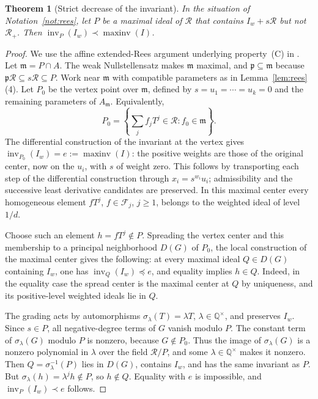 \documentclass[11pt]{amsart}
\numberwithin{equation}{section}
\newtheorem{theorem}{Theorem}[section]
\theoremstyle{definition}
\newcommand{\Q}{\mathbb{Q}}
\newcommand{\fm}{\mathfrak{m}}
\newcommand{\fp}{\mathfrak{p}}
\newcommand{\cF}{\mathcal{F}}
\newcommand{\cR}{\mathcal{R}}
\DeclareMathOperator{\inv}{inv}
\DeclareMathOperator{\maxinv}{maxinv}
\begin{document}
\begin{theorem}[Strict decrease of the invariant]\label{thm:drop}
In the situation of Notation~\ref{not:rees}, let $P$ be a maximal ideal of $\cR$ that contains $I_w+s\cR$ but not $\cR_+$. Then $\inv_P(I_w)\prec\maxinv(I)$.
\end{theorem}

\begin{proof}
We use the affine extended-Rees argument underlying property~(C) in \cite[Section~2.2]{Brais}. Let $\fm=P\cap A$. The weak Nullstellensatz makes $\fm$ maximal, and $\fp\subseteq\fm$ because $\fp\cR\subseteq s\cR\subseteq P$. Work near $\fm$ with compatible parameters as in Lemma~\ref{lem:rees}(4). Let $P_0$ be the vertex point over $\fm$, defined by $s=u_1=\cdots=u_k=0$ and the remaining parameters of $A_\fm$. Equivalently,
\[
  P_0=\left\{\sum_j f_jT^j\in\cR:f_0\in\fm\right\}.
\]
The differential construction of the invariant at the vertex gives
$\inv_{P_0}(I_w)=e:=\maxinv(I)$: the positive weights are those of the original center, now on the $u_i$, with $s$ of weight zero. This follows by transporting each step of the differential construction through $x_i=s^{w_i}u_i$; admissibility and the successive least derivative candidates are preserved. In this maximal center every homogeneous element $fT^j$, $f\in\cF_j$, $j\ge1$, belongs to the weighted ideal of level $1/d$.

Choose such an element $h=fT^j\notin P$. Spreading the vertex center and this membership to a principal neighborhood $D(G)$ of $P_0$, the local construction of the maximal center gives the following: at every maximal ideal $Q\in D(G)$ containing $I_w$, one has $\inv_Q(I_w)\preceq e$, and equality implies $h\in Q$. Indeed, in the equality case the spread center is the maximal center at $Q$ by uniqueness, and its positive-level weighted ideals lie in $Q$.

The grading acts by automorphisms $\sigma_\lambda(T)=\lambda T$, $\lambda\in\Q^\times$, and preserves $I_w$. Since $s\in P$, all negative-degree terms of $G$ vanish modulo $P$. The constant term of $\sigma_\lambda(G)$ modulo $P$ is nonzero, because $G\notin P_0$. Thus the image of $\sigma_\lambda(G)$ is a nonzero polynomial in $\lambda$ over the field $\cR/P$, and some $\lambda\in\Q^\times$ makes it nonzero. Then $Q=\sigma_\lambda^{-1}(P)$ lies in $D(G)$, contains $I_w$, and has the same invariant as $P$. But $\sigma_\lambda(h)=\lambda^jh\notin P$, so $h\notin Q$. Equality with $e$ is impossible, and $\inv_P(I_w)\prec e$ follows.
\end{proof}
\end{document}
